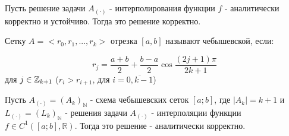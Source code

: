 \documentclass[__main__.tex]{subfiles}
\begin{document}
\begin{definition}
Пусть решение задачи $A_{(\cdot)}$ - интерполирования функции $f$ - аналитически корректно и устойчиво. Тогда это решение корректно.
\end{definition}

\begin{definition}
Сетку $A = <r_0, r_1, \text{...}, r_k>$ отрезка $[a, b]$ называют чебышевской, если:

$$r_j = \frac{a+b}{2} + \frac{b-a}{2}\cos\frac{(2j + 1)\pi}{2k + 1}$$ для $j \in \mathbb{Z}_{k + 1}\\ \\ $ ($r_i > r_{i + 1}$, для $i = \overline{0, k - 1}$)  

\end{definition}

\begin{theorem}
Пусть $A_{(\cdot)} = (A_k)_{\mathbb{N}}$ - схема чебышевских сеток $[a; b]$, где $|A_k| = k + 1$ и $L_{(\cdot)} = (L_{k})_{\mathbb{N}}$ - решения задачи $A_{(\cdot)}$ - интерполяции функции $f \in C^{1}([a; b], \mathbb{R})$. Тогда это решение - аналитически корректно.
\end{theorem}
\end{document}
